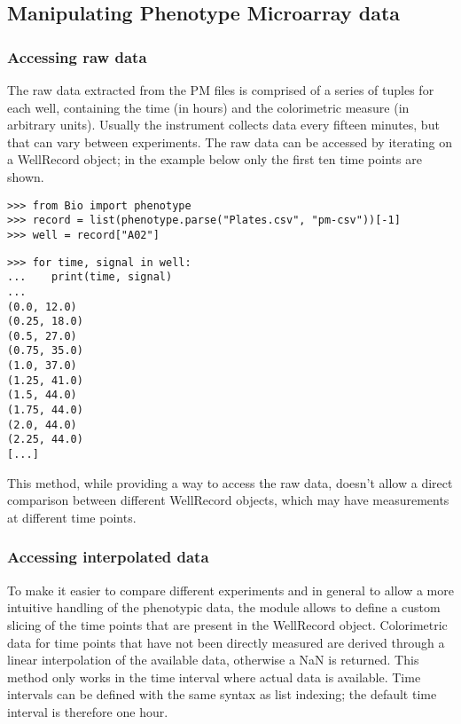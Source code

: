 \subsection{Manipulating Phenotype Microarray data}

\subsubsection{Accessing raw data}
The raw data extracted from the PM files is comprised of a series of tuples for each well,
containing the time (in hours) and the colorimetric measure (in arbitrary units).
Usually the instrument collects data every fifteen minutes, but that can vary between
experiments. The raw data can be accessed by iterating on a WellRecord object;
in the example below only the first ten time points are shown.

\begin{verbatim}
>>> from Bio import phenotype
>>> record = list(phenotype.parse("Plates.csv", "pm-csv"))[-1]
>>> well = record["A02"]
\end{verbatim}
\begin{verbatim}
>>> for time, signal in well:
...    print(time, signal)
...
(0.0, 12.0)
(0.25, 18.0)
(0.5, 27.0)
(0.75, 35.0)
(1.0, 37.0)
(1.25, 41.0)
(1.5, 44.0)
(1.75, 44.0)
(2.0, 44.0)
(2.25, 44.0)
[...]
\end{verbatim}

This method, while providing a way to access the raw data, doesn't allow a direct
comparison between different WellRecord objects, which may have measurements at
different time points.

\subsubsection{Accessing interpolated data}
To make it easier to compare different experiments and in general to allow a more intuitive handling
of the phenotypic data, the module allows to define a custom slicing of the time points that are present
in the WellRecord object. Colorimetric data for time points that have not been directly measured are
derived through a linear interpolation of the available data, otherwise a NaN is returned.
This method only works in the time interval where actual data is available.
Time intervals can be defined with the same syntax as list
indexing; the default time interval is therefore one hour.

